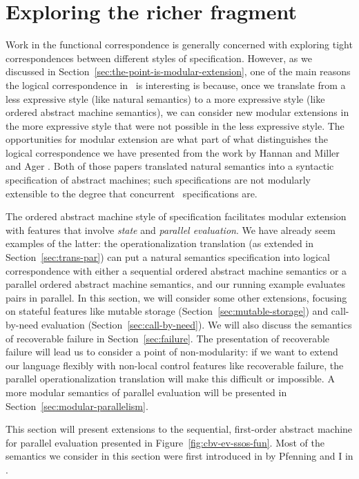 \section{Exploring the richer fragment}
\label{sec:richer-ordered-abstract}

Work in the functional correspondence is generally concerned with
exploring tight correspondences between different styles of
specification. However, as we discussed in
Section~\ref{sec:the-point-is-modular-extension}, one of the main
reasons the logical correspondence in \sls~is interesting is because,
once we translate from a less expressive style (like natural
semantics) to a more expressive style (like ordered abstract machine
semantics), we can consider new modular extensions in the more
expressive style that were not possible in the less expressive
style. The opportunities for modular extension are what part of what
distinguishes the logical correspondence we have presented from the
work by Hannan and Miller \cite{hannan92operational} and Ager
\cite{ager04natural}. Both of those papers translated natural
semantics into a syntactic specification of abstract machines; such
specifications are not modularly extensible to the degree that
concurrent \sls~specifications are.

The ordered abstract machine style of specification facilitates
modular extension with features that involve {\it state} and {\it
  parallel evaluation}. We have already seem examples of the latter:
the operationalization translation (as extended in
Section~\ref{sec:trans-par}) can put a natural semantics specification
into logical correspondence with either a sequential ordered abstract
machine semantics or a parallel ordered abstract machine semantics,
and our running example evaluates pairs in parallel. In this section,
we will consider some other extensions, focusing on stateful features
like mutable storage (Section~\ref{sec:mutable-storage}) and
call-by-need evaluation (Section~\ref{sec:call-by-need}). We will also
discuss the semantics of recoverable failure in
Section~\ref{sec:failure}. The presentation of recoverable failure
will lead us to consider a point of non-modularity: if we want to
extend our language flexibly with non-local control features like
recoverable failure, the parallel operationalization translation will
make this difficult or impossible.  A more modular semantics of
parallel evaluation will be presented in
Section~\ref{sec:modular-parallelism}.

This section will present extensions to the sequential, first-order
abstract machine for parallel evaluation presented in
Figure~\ref{fig:cbv-ev-ssos-fun}. Most of the semantics we consider in
this section were first introduced in by Pfenning and I in
\cite{pfenning09substructural}.

